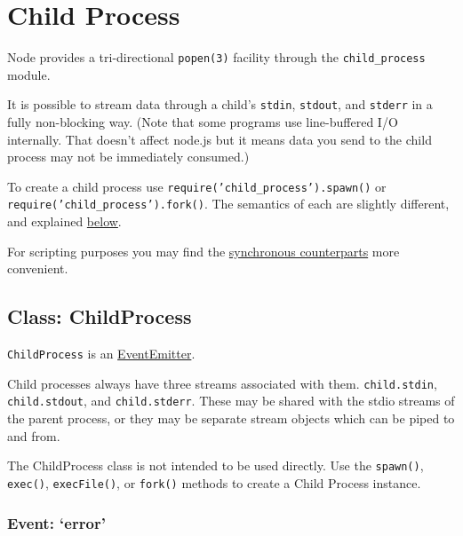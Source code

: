 \section{Child Process}\label{child-process}

\begin{Shaded}
\begin{Highlighting}[]
 
\end{Highlighting}
\end{Shaded}

Node provides a tri-directional \texttt{popen(3)} facility through the
\texttt{child\_process} module.

It is possible to stream data through a child's \texttt{stdin},
\texttt{stdout}, and \texttt{stderr} in a fully non-blocking way. (Note
that some programs use line-buffered I/O internally. That doesn't affect
node.js but it means data you send to the child process may not be
immediately consumed.)

To create a child process use \texttt{require('child\_process').spawn()}
or \texttt{require('child\_process').fork()}. The semantics of each are
slightly different, and explained
\hyperref[childux5fprocessux5fasynchronousux5fprocessux5fcreation]{below}.

For scripting purposes you may find the
\hyperref[childux5fprocessux5fsynchronousux5fprocessux5fcreation]{synchronous
counterparts} more convenient.

\subsection{Class: ChildProcess}\label{class-childprocess}

\texttt{ChildProcess} is an
\href{events.html\#events_class_events_eventemitter}{EventEmitter}.

Child processes always have three streams associated with them.
\texttt{child.stdin}, \texttt{child.stdout}, and \texttt{child.stderr}.
These may be shared with the stdio streams of the parent process, or
they may be separate stream objects which can be piped to and from.

The ChildProcess class is not intended to be used directly. Use the
\texttt{spawn()}, \texttt{exec()}, \texttt{execFile()}, or
\texttt{fork()} methods to create a Child Process instance.

\subsubsection{Event: `error'}\label{event-error}

